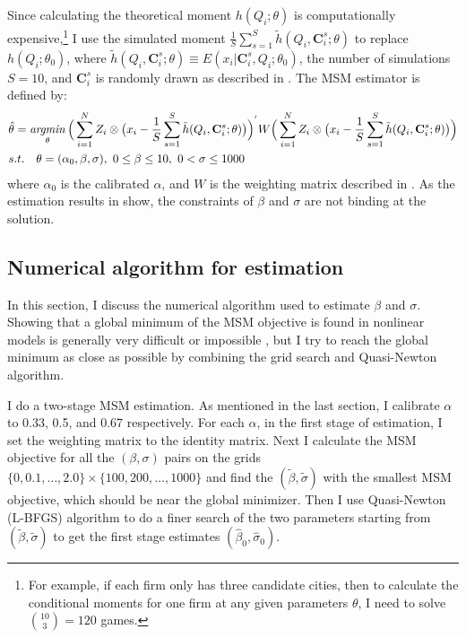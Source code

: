 Since calculating the theoretical moment $h(Q_i; \theta)$ is computationally expensive,\footnote{
    For example, if each firm only has three candidate cities,
    then to calculate the conditional moments for one firm at any given parameters $\theta$,
    I need to solve $\binom{10}{3} = 120$ games.}
I use the simulated moment
$\frac{1}{S} \sum\limits_{s=1}^{S} \tilde{h}(Q_i, \mathbf{C}^{s}_{i}; \theta)$ to replace
$h(Q_i; \theta_0)$,
where
$\tilde{h}(Q_i, \mathbf{C}^{s}_{i}; \theta)\equiv E(x_i|\mathbf{C}^{s}_{i}, Q_i;\theta_0)$,
the number of simulations $S=10$,
and $\mathbf{C}^{s}_{i}$ is randomly drawn
as described in .
The MSM estimator is defined by:
\begin{align}
     & \hat{\theta} = \mathop{\it argmin}_{\theta}
    \Big(\sum\limits_{i=1}^{N}Z_i \otimes \big(x_i - \frac{1}{S}
    \sum\limits_{s=1}^{S} \tilde{h}(Q_i, \mathbf{C}^{s}_{i}; \theta)\big)\Big)^{'}
    W
    \Big(\sum\limits_{i=1}^{N}Z_i \otimes \big(x_i - \frac{1}{S}
    \sum\limits_{s=1}^{S} \tilde{h}(Q_i, \mathbf{C}^{s}_{i}; \theta)\big)\Big) \\
     & s.t. \quad \theta = (\alpha_0, \beta, \sigma),
    ~0 \leq \beta \leq 10,  ~0 < \sigma \leq 1000 \nonumber
    \label{msm criteria}
\end{align}
where $\alpha_0$ is the calibrated $\alpha$, and $W$ is the weighting matrix described in
. As the estimation results in  show,
the constraints of $\beta$ and $\sigma$ are not binding at the solution.



\subsection{Numerical algorithm for estimation}
\label{numerical_algorithm}
In this section, I discuss the numerical algorithm used to
estimate $\beta$ and $\sigma$.
Showing that a global minimum of the MSM objective is found in nonlinear models
is generally very difficult or impossible \citep{iskhakov2021effects}, but I try to reach the
global minimum as close as possible by combining the grid search and Quasi-Newton algorithm.

I do a two-stage MSM estimation.
As mentioned in the last section, I calibrate $\alpha$ to 0.33, 0.5, and 0.67 respectively.
For each $\alpha$,
in the first stage of estimation,
I set the weighting matrix to the identity matrix.
Next I calculate the MSM objective for all the $(\beta, \sigma)$ pairs
on the grids $\{0, 0.1, \dots, 2.0\} \times \{100, 200, \dots, 1000\}$ and find the
$(\tilde{\beta}, \tilde{\sigma})$ with the smallest MSM objective,
which should be near the global minimizer.
Then I use Quasi-Newton (L-BFGS) algorithm to do a finer search of the two parameters starting from
$(\tilde{\beta}, \tilde{\sigma})$ to get the first stage estimates
$(\hat{\beta}_0, \hat{\sigma}_0)$.

